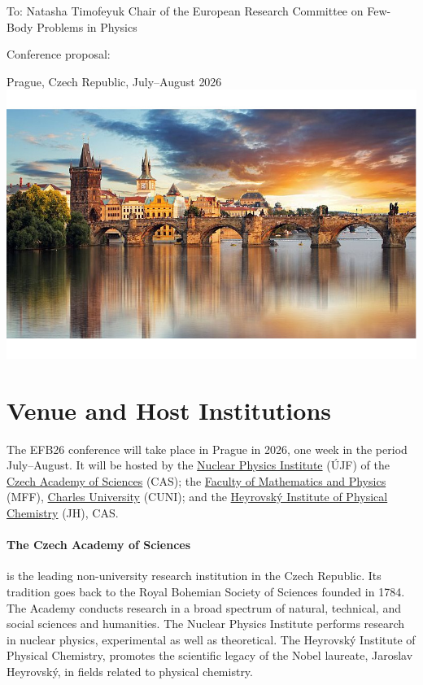 \documentclass[12pt]{extarticle}
\begin{document}
\color{C0}


\noindent
To: Natasha Timofeyuk \newline
Chair of the European Research Committee \newline
on Few-Body Problems in Physics

\bigskip
\noindent
\doublespacing
  \noindent
  {\Large Conference proposal:}

  \bigskip
\doublespacing
{} \newline
{\Large Prague, Czech Republic, July--August 2026}\\
\includegraphics[width=1.0\textwidth]{Prague_foto_cut}

\onehalfspacing
\section*{Venue and Host Institutions}
\noindent
The EFB26 conference will take place in Prague in 2026, one week in
the period July--August. It will be hosted by the
\href{http://www.ujf.cas.cz/en/}{Nuclear Physics Institute} (ÚJF)
of the
\href{https://www.avcr.cz/en/}{Czech Academy of Sciences} (CAS); the
\href{https://www.mff.cuni.cz/en}{Faculty of Mathematics and
  Physics} (MFF), \href{https://cuni.cz/UKEN-1.html}{Charles
  University} (CUNI);
and the
\href{https://www.jh-inst.cas.cz/}{Heyrovský Institute of Physical
  Chemistry} (JH), CAS.

\paragraph{The Czech Academy of Sciences} is the leading
non-university research institution in the Czech Republic. Its
tradition goes back to the Royal Bohemian Society of Sciences founded
in 1784. The Academy conducts research in a broad spectrum of natural,
technical, and social sciences and humanities. The Nuclear Physics
Institute performs research in nuclear physics, experimental as well
as theoretical. The Heyrovský Institute of Physical Chemistry,
promotes the scientific legacy of the Nobel laureate, Jaroslav
Heyrovský, in fields related to physical chemistry.
\end{document}

